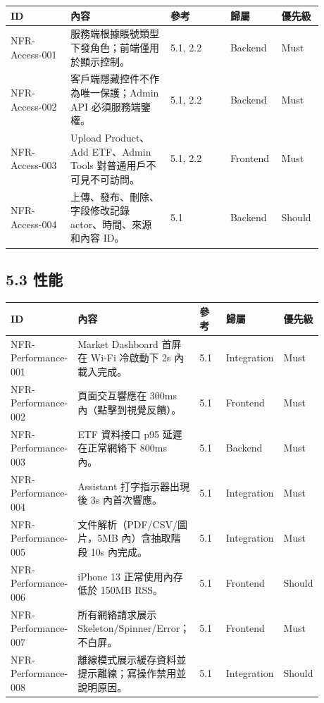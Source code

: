 \begingroup
\small
\begin{longtable}{L{0.18\linewidth}L{0.30\linewidth}L{0.18\linewidth}L{0.12\linewidth}L{0.10\linewidth}}
\toprule
\textbf{ID} & \textbf{內容} & \textbf{參考} & \textbf{歸屬} & \textbf{優先級} \\
\midrule
NFR-Access-001 & 服務端根據賬號類型下發角色；前端僅用於顯示控制。 & 5.1, 2.2 & Backend & Must \\
NFR-Access-002 & 客戶端隱藏控件不作為唯一保護；Admin API 必須服務端鑒權。 & 5.1, 2.2 & Backend & Must \\
NFR-Access-003 & Upload Product、Add ETF、Admin Tools 對普通用戶不可見不可訪問。 & 5.1, 2.2 & Frontend & Must \\
NFR-Access-004 & 上傳、發布、刪除、字段修改記錄 actor、時間、來源和內容 ID。 & 5.1 & Backend & Should \\
\bottomrule
\end{longtable}
\endgroup

\subsection{5.3 性能}

\begingroup
\small
\begin{longtable}{L{0.18\linewidth}L{0.30\linewidth}L{0.18\linewidth}L{0.12\linewidth}L{0.10\linewidth}}
\toprule
\textbf{ID} & \textbf{內容} & \textbf{參考} & \textbf{歸屬} & \textbf{優先級} \\
\midrule
NFR-Performance-001 & Market Dashboard 首屏在 Wi-Fi 冷啟動下 2s 內載入完成。 & 5.1 & Integration & Must \\
NFR-Performance-002 & 頁面交互響應在 300ms 內（點擊到視覺反饋）。 & 5.1 & Frontend & Must \\
NFR-Performance-003 & ETF 資料接口 p95 延遲在正常網絡下 800ms 內。 & 5.1 & Backend & Must \\
NFR-Performance-004 & Assistant 打字指示器出現後 3s 內首次響應。 & 5.1 & Integration & Must \\
NFR-Performance-005 & 文件解析（PDF/CSV/圖片，5MB 內）含抽取階段 10s 內完成。 & 5.1 & Integration & Must \\
NFR-Performance-006 & iPhone 13 正常使用內存低於 150MB RSS。 & 5.1 & Frontend & Should \\
NFR-Performance-007 & 所有網絡請求展示 Skeleton/Spinner/Error；不白屏。 & 5.1 & Frontend & Must \\
NFR-Performance-008 & 離線模式展示緩存資料並提示離線；寫操作禁用並說明原因。 & 5.1 & Integration & Should \\
\bottomrule
\end{longtable}
\endgroup

